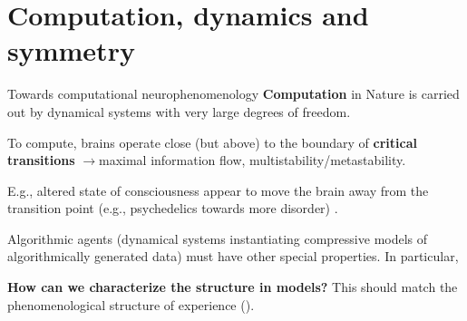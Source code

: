 \section{Computation, dynamics and symmetry}





\begin{frame}[label=ladila]{Towards computational neurophenomenology}
 \textbf{Computation} in Nature is carried out by dynamical systems with very large degrees of freedom.  \vfill
 
  To compute, brains operate close (but above)  to the boundary of  \textbf{critical transitions}  \citep{Bak1988,Chialvo:2004aa,Cocchi2017,Carhart2018,Deco2021} $\longrightarrow$maximal information flow, multistability/metastability. \vfill
  
  E.g., altered state of consciousness appear to move the brain away from the transition point (e.g., psychedelics towards more disorder) \citep{CarhartHarris2019,Ruffini:2022ac}. %
  \vfill
  
  Algorithmic agents (dynamical systems instantiating  compressive models of  algorithmically generated data)  must have other special properties. In particular, \vfill
  
  \textbf{How can we characterize the structure in models?} This should match the phenomenological structure of experience (\SEP).\vfill

  \end{frame}
  
